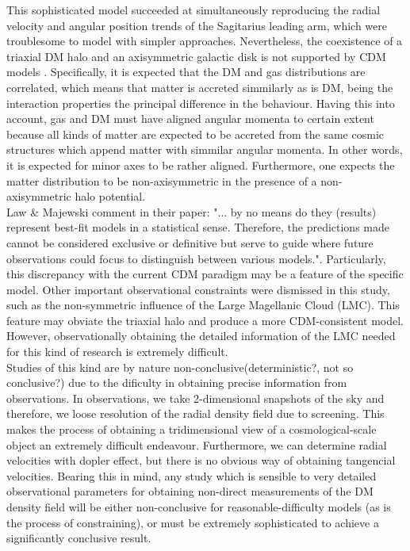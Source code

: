 This sophisticated model succeeded at simultaneously reproducing the radial velocity and angular position trends of the Sagitarius leading arm, which were troublesome to model with simpler approaches. Nevertheless, the coexistence of a triaxial DM halo and an axisymmetric galactic disk is not supported by CDM models \cite{Debattista et al. 2008}. Specifically, it is expected that the DM and gas distributions are correlated, which means that matter is accreted simmilarly as is DM, being the interaction properties the principal difference in the behaviour. Having this into account, gas and DM must have aligned angular momenta to certain extent because all kinds of matter are expected to be accreted from the same cosmic structures which append matter with simmilar angular momenta. In other words, it is expected for minor axes to be rather aligned. Furthermore, one expects the matter distribution to be non-axisymmetric in the presence of a non-axisymmetric halo potential.\\

Law & Majewski comment in their paper: "... by no means do they (results) represent best-fit models in a statistical sense. Therefore, the predictions made cannot be considered exclusive or definitive but serve to guide where future observations could focus to distinguish between various models.". Particularly, this discrepancy with the current CDM paradigm may be a feature of the specific model. Other important observational constraints were dismissed in this study, such as the non-symmetric influence of the Large Magellanic Cloud (LMC). This feature may obviate the triaxial halo and produce a more CDM-consistent model. However, observationally obtaining the detailed information of the LMC needed for this kind of research is extremely difficult.\\

Studies of this kind are by nature non-conclusive(deterministic?, not so conclusive?) due to the dificulty in obtaining precise information from observations. In observations, we take 2-dimensional snapshots of the sky and therefore, we loose resolution of the radial density field due to screening. This makes the process of obtaining  a tridimensional view of a cosmological-scale object an extremely difficult endeavour. Furthermore, we can determine radial velocities with dopler effect, but there is no obvious way of obtaining tangencial velocities. Bearing this in mind, any study which is sensible to very detailed observational parameters for obtaining non-direct measurements of the DM density field will be either non-conclusive for reasonable-difficulty models (as is the process of constraining), or must be extremely sophisticated to achieve a significantly conclusive result.\\

